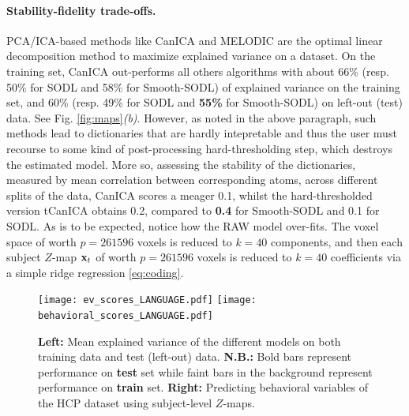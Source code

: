 \paragraph{Stability-fidelity trade-offs.}
PCA/ICA-based methods like CanICA   \citep{varoquaux2010group} and MELODIC   \citep{smith2004advances} are the optimal linear decomposition method to maximize
explained variance on a dataset. On the training set,  CanICA   \citep{varoquaux2010group} out-performs all
others algorithms with about 66\% (resp. 50\% for SODL  \citep{mairal2010} and 58\% for Smooth-SODL) of explained variance on the training set, and 60\% (resp. 49\% for SODL and \textbf{55\%} for Smooth-SODL) on left-out (test) data. See Fig. \ref{fig:maps}\textit{(b)}. However, as noted in the above paragraph, such methods lead to dictionaries that are hardly intepretable and thus the user must
recourse to some kind of post-processing hard-thresholding step, which destroys the estimated model. More so,
assessing the stability of the dictionaries, measured by mean correlation between corresponding atoms, across different splits of the data, CanICA   \citep{varoquaux2010group} scores a meager 0.1, whilst the hard-thresholded version tCanICA obtains 0.2, compared to \textbf{0.4} for Smooth-SODL and 0.1 for SODL.   As is to be expected, notice how the RAW model over-fits.
The voxel space of worth $p=261596$ voxels is reduced to $k=40$ components, and then each subject $Z$-map $\mathbf{x}_t$ of worth $p=261596$ voxels is reduced to $k=40$ coefficients via a simple ridge regression \eqref{eq:coding}.

 \begin{figure}[!htpb]
   \texttt{[image: ev\_scores\_LANGUAGE.pdf]}
   \texttt{[image: behavioral\_scores\_LANGUAGE.pdf]}  

   \caption{\textbf{Left:} Mean explained variance of the different models on both training data and test (left-out) data. \textbf{N.B.:} Bold bars represent performance on \textbf{test} set while faint bars in the 
  background represent performance on \textbf{train} set. 
  \textbf{Right:} Predicting  behavioral  variables of the HCP  \citep{VanEssen20122222} dataset using subject-level $Z$-maps.
  }
  \end{figure}


